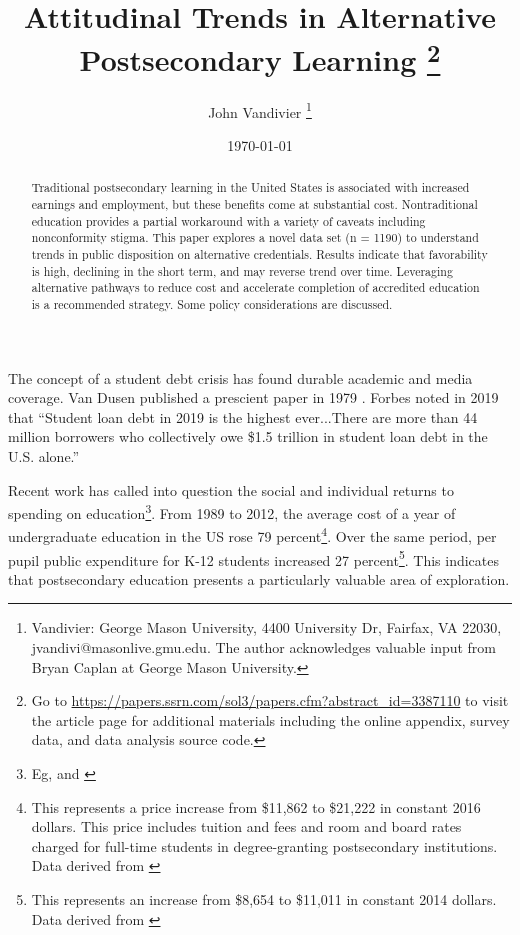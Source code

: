 \documentclass[AER]{./aea-latex-templates/AEA}
\begin{document}
\title{Attitudinal Trends in Alternative Postsecondary Learning
    \thanks{Go to \url{https://papers.ssrn.com/sol3/papers.cfm?abstract_id=3387110} to visit the article page for additional materials including the online appendix, survey data, and data analysis source code.}}
\author{John Vandivier
    \thanks{Vandivier: George Mason University, 4400 University Dr, Fairfax, VA 22030, jvandivi@masonlive.gmu.edu. The author acknowledges valuable input from Bryan Caplan at George Mason University.}}
\date{\today}

\begin{abstract}
Traditional postsecondary learning in the United States is associated
with increased earnings and employment, but these benefits come at
substantial cost. Nontraditional education provides a partial workaround
with a variety of caveats including nonconformity stigma. This paper
explores a novel data set (n = 1190) to understand trends in public
disposition on alternative credentials. Results indicate that
favorability is high, declining in the short term, and may reverse trend
over time. Leveraging alternative pathways to reduce cost and accelerate
completion of accredited education is a recommended strategy. Some
policy considerations are discussed.
\end{abstract}

\maketitle

The concept of a student debt crisis has found durable academic and media
coverage. Van Dusen published a prescient paper in 1979 \cite{van1979coming}. Forbes noted in 2019\cite{friedman2018student} that “Student loan
debt in 2019 is the highest ever...There are more than 44 million borrowers
who collectively owe \$1.5 trillion in student loan debt in the U.S.
alone.”

Recent work has called into question the social and individual returns to spending on
education\footnote{Eg, \cite{caplan2018case} and \cite{craig_2018}}. From 1989 to 2012, the average cost of a year of undergraduate education
in the US rose 79 percent\footnote{This represents a price increase from \$11,862 to \$21,222 in constant 2016
dollars. This price includes tuition and fees and room and board rates charged for full-time students in
degree-granting postsecondary institutions. Data derived from \cite{nces2017averageundergraduatetuition}}.
Over the same period, per pupil public expenditure for
K-12 students increased 27 percent\footnote{This represents an increase from \$8,654 to \$11,011 in constant
2014 dollars. Data derived from \cite{nces2015expendituresperpupil}}. This indicates that
postsecondary education presents a particularly valuable area of exploration.
\end{document}

